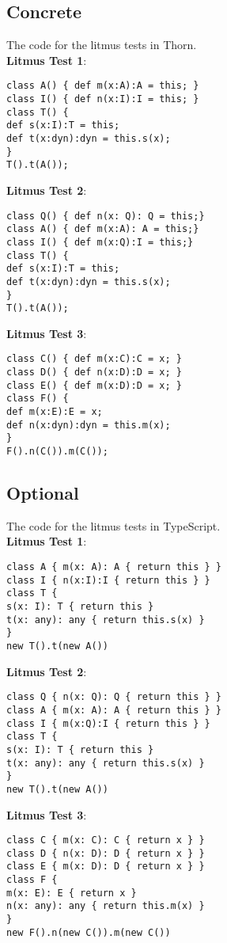 \documentclass[]{article}
\begin{document}
\subsection*{Concrete}

The code for the litmus tests in Thorn. \\ 

\noindent
\textbf{Litmus Test 1}:
\begin{verbatim}
class A() { def m(x:A):A = this; }
class I() { def n(x:I):I = this; }
class T() {
def s(x:I):T = this;
def t(x:dyn):dyn = this.s(x);
}
T().t(A());
\end{verbatim}

\noindent
\textbf{Litmus Test 2}:
\begin{verbatim}
class Q() { def n(x: Q): Q = this;}
class A() { def m(x:A): A = this;}
class I() { def m(x:Q):I = this;}
class T() {
def s(x:I):T = this; 
def t(x:dyn):dyn = this.s(x);
}
T().t(A());   
\end{verbatim}


\noindent\textbf{Litmus Test 3}:
\begin{verbatim}
class C() { def m(x:C):C = x; }
class D() { def n(x:D):D = x; }
class E() { def m(x:D):D = x; }      
class F() {
def m(x:E):E = x;
def n(x:dyn):dyn = this.m(x);
} 
F().n(C()).m(C());
\end{verbatim}

\subsection*{Optional}

The code for the litmus tests in TypeScript. \\

\noindent\textbf{Litmus Test 1}:
\begin{verbatim}
class A { m(x: A): A { return this } }
class I { n(x:I):I { return this } }
class T {
s(x: I): T { return this }
t(x: any): any { return this.s(x) }
}
new T().t(new A())
\end{verbatim}

\noindent\textbf{Litmus Test 2}:
\begin{verbatim}
class Q { n(x: Q): Q { return this } }
class A { m(x: A): A { return this } }
class I { m(x:Q):I { return this } }
class T {
s(x: I): T { return this }
t(x: any): any { return this.s(x) }
}
new T().t(new A())
\end{verbatim}

\noindent\textbf{Litmus Test 3}:
\begin{verbatim}
class C { m(x: C): C { return x } }
class D { n(x: D): D { return x } }
class E { m(x: D): D { return x } }
class F {
m(x: E): E { return x }
n(x: any): any { return this.m(x) }
}
new F().n(new C()).m(new C())
\end{verbatim}
\end{document}
